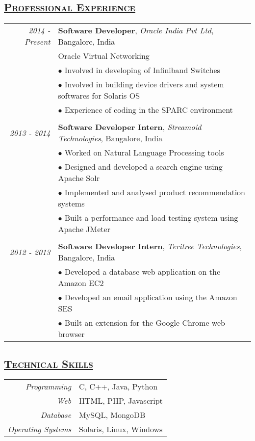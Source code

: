 \documentclass[14pt]{article}
\begin{document}
\subsection* {\scshape\LARGE\uline {Professional Experience}}
\large
\begin{tabularx}{\textwidth}{r X}
\emph{2014 - Present} & \textbf{Software Developer}, \textit{Oracle India Pvt Ltd}, Bangalore, India \\
		                      & Oracle Virtual Networking\\ 
			                & $\bullet$ Involved in developing of Infiniband Switches\\
			                & $\bullet$ Involved in building device drivers and system softwares for  Solaris OS\\
			                & $\bullet$ Experience of coding in the SPARC environment	    
\\ \\

\emph{2013 - 2014} & \textbf{Software Developer Intern}, \textit{Streamoid Technologies}, Bangalore, India \\ 
			            & $\bullet$ Worked on Natural Language Processing tools \\
		 	            & $\bullet$ Designed and developed a search engine using Apache Solr \\
   			            & $\bullet$ Implemented and analysed product recommendation systems \\
			            & $\bullet$ Built a performance and load testing system using Apache JMeter
\\ \\

\emph{2012 - 2013} & \textbf{Software Developer Intern}, \textit{Teritree Technologies}, Bangalore, India \\ 
			            & $\bullet$ Developed a database web application on the Amazon EC2 \\
			            & $\bullet$ Developed an email application using the Amazon SES\\
			            & $\bullet$ Built an extension for the Google Chrome web browser	    
\end{tabularx}

\subsection* {\scshape\LARGE\uline {Technical Skills}}
\begin{tabular}{r l}
\emph{Programming} & C, C++, Java, Python \\
\emph{Web}              & HTML, PHP, Javascript \\
\emph{Database}	  & MySQL, MongoDB \\
\emph{Operating Systems} & Solaris, Linux, Windows
\end{tabular}
\end{document}
